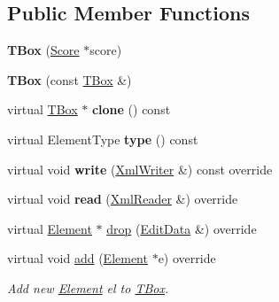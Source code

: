 \subsection*{Public Member Functions}
\begin{DoxyCompactItemize}
\item 
\mbox{\label{class_ms_1_1_t_box_a8902345567a3d481ec9b77a87a338e88}} 
{\bfseries T\+Box} (\hyperlink{class_ms_1_1_score}{Score} $\ast$score)
\item 
\mbox{\label{class_ms_1_1_t_box_a33dc451baac9fed1b2b7693f88c7c87b}} 
{\bfseries T\+Box} (const \hyperlink{class_ms_1_1_t_box}{T\+Box} \&)
\item 
\mbox{\label{class_ms_1_1_t_box_ac589da33ca553d2a9b184b4b826ed4af}} 
virtual \hyperlink{class_ms_1_1_t_box}{T\+Box} $\ast$ {\bfseries clone} () const
\item 
\mbox{\label{class_ms_1_1_t_box_a24a0c17847f263ecce505498a9b86233}} 
virtual Element\+Type {\bfseries type} () const
\item 
\mbox{\label{class_ms_1_1_t_box_a85859feec5e195bd907255895d60b906}} 
virtual void {\bfseries write} (\hyperlink{class_ms_1_1_xml_writer}{Xml\+Writer} \&) const override
\item 
\mbox{\label{class_ms_1_1_t_box_aaeafcfcc53770f69db9d5bd385a77497}} 
virtual void {\bfseries read} (\hyperlink{class_ms_1_1_xml_reader}{Xml\+Reader} \&) override
\item 
virtual \hyperlink{class_ms_1_1_element}{Element} $\ast$ \hyperlink{class_ms_1_1_t_box_a3be73eda7f604bdaa08d124d68a84bca}{drop} (\hyperlink{class_ms_1_1_edit_data}{Edit\+Data} \&) override
\item 
\mbox{\label{class_ms_1_1_t_box_aca7ef7efa514ee1722a78ce8db2bca08}} 
virtual void \hyperlink{class_ms_1_1_t_box_aca7ef7efa514ee1722a78ce8db2bca08}{add} (\hyperlink{class_ms_1_1_element}{Element} $\ast$e) override
\begin{DoxyCompactList}\small\item\em Add new \hyperlink{class_ms_1_1_element}{Element} {\itshape el} to \hyperlink{class_ms_1_1_t_box}{T\+Box}. \end{DoxyCompactList}\item 

\end{DoxyCompactItemize}
